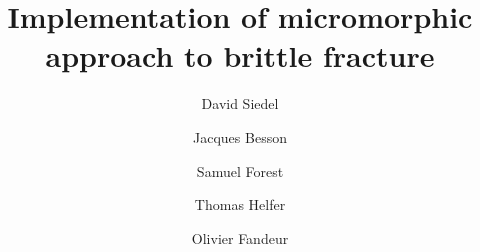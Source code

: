 \documentclass[3p,times,fleqn]{elsarticle}
\begin{document}

\begin{frontmatter}



\dochead{}

  \title{Implementation of micromorphic approach to brittle fracture}


\author[lsc]{David Siedel}
\author[psl]{Jacques Besson}
\author[psl]{Samuel Forest}
\author[lsc]{Thomas Helfer}
\author[lm2s,imsia]{Olivier Fandeur}

\address[lsc]{CEA, DES/IRESNE/DEC/SESC/LSC, Département d'Études des Combustibles, Cadarache, France}
\address[psl]{MINES ParisTech, PSL Research University, MAT - Centre des matériaux, CNRS UMR 7633, Evry BP 87 9103, France}
\address[lm2s]{CEA, ISAS/DES/DM2S/SEMT/LM2S, Département de Modélisation des Systèmes et des Structures, Saclay, France}
\address[imsia]{IMSIA, UMR 8193, CNRS-EDF-CEA-ENSTA}
\address[edf]{EDF R\&D ERMES, 7 Boulevard Gaspard Monge, 91120 Palaiseau, France}

\address{}


\end{frontmatter}
\end{document}
